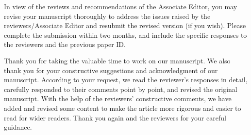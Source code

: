 
\editor

\begin{generalcomment}
In view of the reviews and recommendations of the Associate Editor, you may revise your manuscript thoroughly to address the issues raised by the reviewers/Associate Editor and resubmit the revised version (if you wish). Please complete the submission within two months, and include the specific responses to the reviewers and the previous paper ID.
\end{generalcomment}
\begin{revmeta}[]
Thank you for taking the valuable time to work on our manuscript. We also thank you for your constructive suggestions and acknowledgment of our manuscript. According to your request, we read the reviewer's responses in detail, carefully responded to their comments point by point, and revised the original manuscript. With the help of the reviewers' constructive comments, we have added and revised some content to make the article more rigorous and easier to read for wider readers. Thank you again and the reviewers for your careful guidance.
\end{revmeta}
